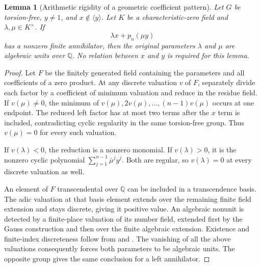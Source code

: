 \documentclass[11pt,a4paper,oneside]{report}
\newtheorem{lemma}[theorem]{Lemma}
\theoremstyle{definition}
\theoremstyle{remark}
\newcommand{\Q}{\mathbb Q}
\begin{document}
\begin{lemma}[Arithmetic rigidity of a geometric coefficient pattern]
\label{M13:invpower:units}
Let $G$ be torsion-free, $y\ne1$, and $x\notin\langle y\rangle$.
Let $K$ be a characteristic-zero field and $\lambda,\mu\in K^\times$.
If
\[
 \lambda x+p_n(\mu y)
\]
has a nonzero finite annihilator, then the original parameters
$\lambda$ and $\mu$ are algebraic units over $\Q$.
No relation between $x$ and $y$ is required for this lemma.
\end{lemma}
\begin{proof}
Let $F$ be the finitely generated field containing the parameters
and all coefficients of a zero product. At any discrete valuation
$v$ of $F$, separately divide each factor by a coefficient of
minimum valuation and reduce in the residue field.
If $v(\mu)\ne0$, the minimum of
$v(\mu),2v(\mu),\ldots,(n-1)v(\mu)$ occurs at one endpoint.
The reduced left factor has at most two terms after the $x$ term
is included, contradicting cyclic regularity in the same torsion-free
group. Thus $v(\mu)=0$ for every such valuation.

If $v(\lambda)<0$, the reduction is a nonzero monomial. If
$v(\lambda)>0$, it is the nonzero cyclic polynomial
$\sum_{j=1}^{n-1}\bar\mu^j y^j$. Both are regular, so
$v(\lambda)=0$ at every discrete valuation as well.

An element of $F$ transcendental over $\Q$ can be included in a
transcendence basis. The adic valuation at that basis element
extends over the remaining finite field extension and stays
discrete, giving it positive value. An algebraic nonunit is
detected by a finite-place valuation of its number field, extended
first by the Gauss construction and then over the finite algebraic
extension. Existence and finite-index discreteness follow from
\cite[Lemma 10.50.2]{B:StacksVal} and
\cite[Lemma 15.125.2]{B:StacksExt}. The vanishing of all the above
valuations consequently forces both parameters to be algebraic units.
The opposite group gives the same conclusion for a left annihilator.
\end{proof}
\end{document}
